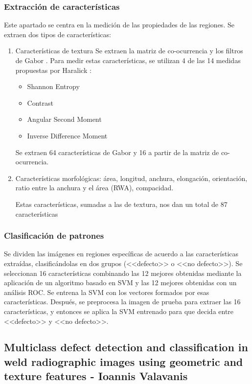 \subsubsection{Extracción de características}
Este apartado se centra en la medición de las propiedades de las regiones. Se extraen dos tipos de características:
	\begin{enumerate}
	\item Características de textura
	Se extraen la matriz de co-ocurrencia y los filtros de Gabor \cite{daugman1988complete}. Para medir estas características, se utilizan 4 de las 14 medidas propuestas por Haralick \cite{haralick1973textural}:
		\begin{itemize}
		\item Shannon Entropy
		\item Contrast
		\item Angular Second Moment
		\item Inverse Difference Moment
		\end{itemize}
	Se extraen 64 características de Gabor y 16 a partir de la matriz de co-ocurrencia.

	\item Características morfológicas: área, longitud, anchura, elongación, orientación, ratio entre la anchura y el área (RWA), compacidad.
	
	Estas características, sumadas a las de textura, nos dan un total de 87 características
	\end{enumerate}


\subsubsection{Clasificación de patrones}
Se dividen las imágenes en regiones específicas de acuerdo a las características extraídas, clasificándolas en dos grupos (<<defecto>> o <<no defecto>>).
Se seleccionan 16 características combinando las 12 mejores obtenidas mediante la aplicación de un algoritmo basado en SVM y las 12 mejores obtenidas con un análisis ROC.
Se entrena la SVM con los vectores formados por esas características.
Después, se preprocesa la imagen de prueba para extraer las 16 características, y entonces se aplica la SVM entrenado para que decida entre <<defecto>> y <<no defecto>>.


\subsection{Multiclass defect detection and classification in weld radiographic images using geometric and texture features - Ioannis Valavanis}

